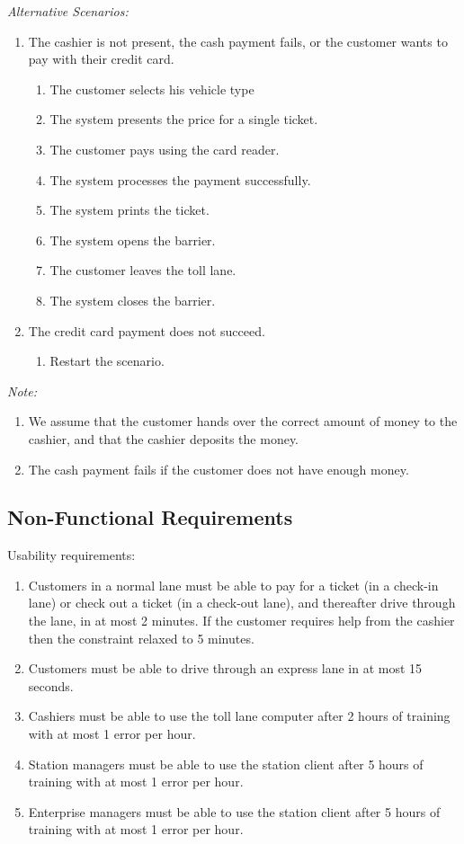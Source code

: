 \textit{Alternative Scenarios: }
\begin{enumerate}
	\item The cashier is not present, the cash payment fails, or the customer wants to pay with their credit card.
		\begin{enumerate}
			\item The customer selects his vehicle type
			\item The system presents the price for a single ticket.
			\item The customer pays using the card reader.
			\item The system processes the payment successfully.
			\item The system prints the ticket.
			\item The system opens the barrier.
			\item The customer leaves the toll lane.
			\item The system closes the barrier.
		\end{enumerate}
		
	\item The credit card payment does not succeed. 
		\begin{enumerate}
			\item Restart the scenario.
		\end{enumerate}

 \end{enumerate} 
 
 \textit{Note:} 
 \begin{enumerate}
 \item We assume that the customer hands over the correct amount of money to the cashier, and that the cashier deposits the money.
 \item The cash payment fails if the customer does not have enough money.
 \end{enumerate}


\subsection{Non-Functional Requirements}
Usability requirements:
\begin{enumerate}
\item Customers in a normal lane must be able to pay for a ticket (in a check-in lane) or check out a ticket (in a check-out lane), and thereafter drive through the lane, in at most 2 minutes. If the customer requires help from the cashier then the constraint relaxed to 5 minutes.
\item Customers must be able to drive through an express lane in at most 15 seconds.
\item Cashiers must be able to use the toll lane computer after 2 hours of training with at most 1 error per hour.
\item Station managers must be able to use the station client after 5 hours of training with at most 1 error per hour.
\item Enterprise managers must be able to use the station client after 5 hours of training with at most 1 error per hour.
\end{enumerate}


